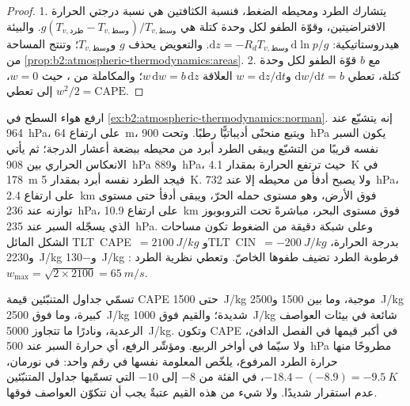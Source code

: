 \begin{proof}
1. يتشارك الطرد ومحيطه الضغط، فنسبة الكثافتين هي نسبة
درجتي الحرارة الافتراضيتين، وقوّة الطفو لكل وحدة كتلة هي
$g(T_{v,\text{طرد}} - T_{v,\text{وسط}})/T_{v,\text{وسط}}$. والبيئة هيدروستاتيكية:
$\mathrm{d}z = -R_dT_{v,\text{وسط}}\,\mathrm{d}\ln p/g$. والتعويض يحذف $g$
و$T_{v,\text{وسط}}$؛ وتنتج المساحة من \cref{prop:b2:atmospheric-thermodynamics:areas}.
2. مع $b$ قوّة الطفو لكل وحدة كتلة، تعطي $\mathrm{d}w/\mathrm{d}t = b$ و$w = \mathrm{d}z/
\mathrm{d}t$ العلاقة $w\,\mathrm{d}w = b\,\mathrm{d}z$؛ والمكاملة من ، حيث $w = 0$، إلى
 تعطي $w^2/2 = \text{CAPE}$.
\end{proof}

\begin{example}\label{ex:b2:atmospheric-thermodynamics:cape}
ارفع هواء السطح في \cref{ex:b2:atmospheric-thermodynamics:norman}. إنه يتشبّع عند
\qty{964}{hPa}، على ارتفاع \qty{64}{m}، ويتبع منحنًى أديباتيًّا رطبًا. وتحت \qty{900}{hPa} يكون السبر
نفسه قريبًا من التشبّع ويبقى الطرد أبرد من محيطه ببضعة أعشار الدرجة؛
ثم يأتي الانعكاس الحراري بين \qty{908}{hPa} و\qty{889}{hPa}، حيث ترتفع
الحرارة بمقدار \qty{4.1}{K} في \qty{178}{m} فيجد الطرد نفسه أبرد بمقدار \qty{5}{K}.
ولا يصبح أدفأ من محيطه إلا عند \qty{732}{hPa}، على ارتفاع \qty{2.4}{km} فوق
الأرض، وهو مستوى حمله الحرّ، ويبقى أدفأ حتى مستوى توازنه عند \qty{236}{hPa}، على ارتفاع \qty{10.9}{km} فوق مستوى البحر،
مباشرةً تحت التروبوبوز الذي يسجّله السبر عند \qty{235}{hPa}. وعلى شبكة دقيقة من الضغوط تكون
مساحات الشكل المائل \mbox{\textdir TLT CAPE $= \qty{2100}{J/kg}$} و\mbox{\textdir TLT CIN $= \qty{-200}{J/kg}$} بدرجة
الحرارة، و\qty{2230}{J/kg} و\qty{-130}{J/kg} : فرطوبة
الطرد تضيف طفوها الخاصّ. وتعطي نظرية الطرد $w_{\max} = \sqrt{2 \times 2100} =
\qty{65}{m/s}$.
\end{example}

تسمّي جداول المتنبّئين قيمة CAPE حتى \qty{1500}{J/kg} موجبة، وما بين 1500
و\qty{2500}{J/kg} كبيرة، وما فوق \qty{2500}{J/kg} شديدة؛ والقيم فوق \qty{1000}{J/kg} شائعة في بيئات العواصف الرعدية،
ونادرًا ما تتجاوز \qty{5000}{J/kg}. وتكون CAPE في أكبر قيمها في الفصل الدافئ، ولا سيّما في أواخر
الربيع. ومؤشّر الرفع، أي حرارة السبر عند \qty{500}{hPa} مطروحًا منها حرارة الطرد
المرفوع، يلخّص المعلومة نفسها في رقم واحد: في نورمان، $-18.4 - (-8.9) = \qty{-9.5}{K}$،
في الفئة من $-8$ إلى $-10$ التي تسمّيها جداول المتنبّئين عدم استقرار شديدًا. ولا شيء من
هذه القيم عتبةٌ يجب أن تتكوّن العواصف فوقها.

